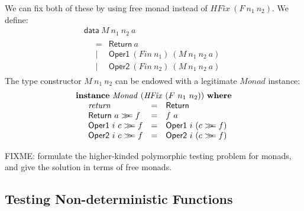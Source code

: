 \documentclass{llncs}
\newcommand{\mbind}{\mathrel{>\kern-0.45em>\kern-0.45em=}}
\begin{document}
We can fix both of these by using free monad instead of
$\mathit{HFix}~(F~n_1~n_2)$. We define:
\begin{displaymath}
  \begin{array}{l}
    \mathsf{data}~M~n_1~n_2~a \\
    \quad
    \begin{array}{cl}
      = & \mathsf{Return}~a \\
      | & \mathsf{Oper1}~(\mathit{Fin}~n_1)~(M~n_1~n_2~a) \\
      | & \mathsf{Oper2}~(\mathit{Fin}~n_2)~(M~n_1~n_2~a)
    \end{array}
  \end{array}
\end{displaymath}
The type constructor $M~n_1~n_2$ can be endowed with a legitimate
$\mathit{Monad}$ instance:
\begin{displaymath}
  \begin{array}{l}
    \mathbf{instance}~\mathit{Monad}~(\mathit{HFix}~(F~n_1~n_2))~\mathbf{where} \\
    \quad
    \begin{array}{lcl}
      \mathit{return}             &=& \mathsf{Return} \\
      \mathsf{Return}~a \mbind f  &=& f~a \\
      \mathsf{Oper1}~i~c \mbind f &=& \mathsf{Oper1}~i~(c \mbind f) \\
      \mathsf{Oper2}~i~c \mbind f &=& \mathsf{Oper2}~i~(c \mbind f) \\
    \end{array}
  \end{array}
\end{displaymath}






FIXME: formulate the higher-kinded polymorphic testing problem for
monads, and give the solution in terms of free monads.

\subsection{Testing Non-deterministic Functions}
\end{document}
